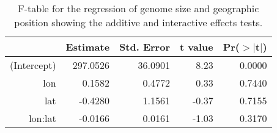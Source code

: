 \begin{table}[ht]
\centering
\begin{tabular}{rrrrr}
  \hline
 & Estimate & Std. Error & t value & Pr($>$$|$t$|$) \\ 
  \hline
(Intercept) & 297.0526 & 36.0901 & 8.23 & 0.0000 \\ 
  lon & 0.1582 & 0.4772 & 0.33 & 0.7440 \\ 
  lat & -0.4280 & 1.1561 & -0.37 & 0.7155 \\ 
  lon:lat & -0.0166 & 0.0161 & -1.03 & 0.3170 \\ 
   \hline
\end{tabular}
\caption{F-table for the regression of genome size and geographic position showing the additive and interactive effects tests.} 
\label{tab:sizegeo}
\end{table}
